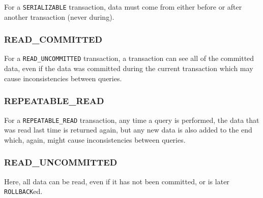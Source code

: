 For a \texttt{SERIALIZABLE} transaction, data must come from either before or after another transaction (never during).

\subsubsection{READ\_COMMITTED}\label{ssub:read_committed}

For a \texttt{READ_UNCOMMITTED} transaction, a transaction can see all of the committed data, even if the data was committed during the current transaction which may cause inconsistencies between queries.

\subsubsection{REPEATABLE\_READ}\label{ssub:repeatable_read}

For a \texttt{REPEATABLE_READ} transaction, any time a query is performed, the data that was read last time is returned again, but any new data is also added to the end which, again, might cause inconsistencies between queries.

\subsubsection{READ\_UNCOMMITTED}\label{ssub:read_uncommitted}

Here, all data can be read, even if it has not been committed, or is later \texttt{ROLLBACK}ed.

